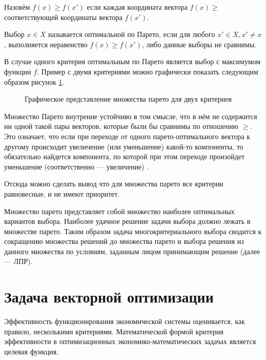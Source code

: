\documentclass[a4paper,14pt]{report}
\begin{document}
Назовём $f(x) \geq f(x')$ если каждая координата вектора $f(x) \geq $ соответствующей координаты вектора  $f(x')$.
 
Выбор $x \in X$ называется оптимальной по Парето, если для любого $x' \in X, x' \neq x$, выполняется неравенство $f(x) \geq f(x')$, либо данные выборы не сравнимы. 
 

В случае одного критерия оптимальным по Парето является выбор с максимумом функции $f$. Пример с двумя критериями можно графически показать следующим образом рисунок \ref{pic:par}. 

\begin{figure}[H]
 \caption{Графическое представление множества парето для двух критериев}
 \label{pic:par}
\end{figure}

Множество Парето внутренне устойчиво в том смысле, что в нём не содержится ни одной
такой пары векторов, которые были бы сравнимы по отношению $\geq$.
Это означает, что если при переходе от одного парето-оптимального
вектора к другому происходит увеличение (или уменьшение) какой-то компоненты, то обязательно найдется компонента, по которой
при этом переходе произойдет уменьшение (соответственно --- увеличение) \cite{pareto}.

Отсюда можно сделать вывод что для множества парето все критерии равновесные, и не имеют приоритет.

Множество парето представляет собой множество наиболее оптимальных вариантов выбора. Наиболее удачное решение задачи выбора должно лежать в множестве парето.
Таким образом задача многокритериального выбора сводится к сокращению множества решений до множества парето и выбора решения из данного множества по условиям, заданным лицом принимающим решение (далее --- ЛПР).


\section{Задача векторной оптимизации}
Эффективность функционирования экономической системы оценивается, как правило, несколькими критериями. Математической формой критерия эффективности в оптимизационных экономико-математических задачах является целевая функция.
\end{document}
